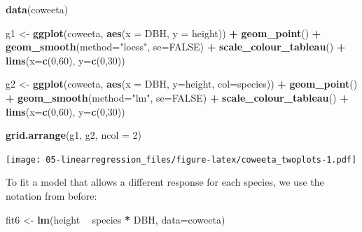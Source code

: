 \documentclass[]{book}
\newenvironment{Shaded}{\begin{snugshade}}{\end{snugshade}}
\newcommand{\DataTypeTok}[1]{\textcolor[rgb]{0.13,0.29,0.53}{#1}}
\newcommand{\DecValTok}[1]{\textcolor[rgb]{0.00,0.00,0.81}{#1}}
\newcommand{\KeywordTok}[1]{\textcolor[rgb]{0.13,0.29,0.53}{\textbf{#1}}}
\newcommand{\NormalTok}[1]{#1}
\newcommand{\OperatorTok}[1]{\textcolor[rgb]{0.81,0.36,0.00}{\textbf{#1}}}
\newcommand{\OtherTok}[1]{\textcolor[rgb]{0.56,0.35,0.01}{#1}}
\newcommand{\StringTok}[1]{\textcolor[rgb]{0.31,0.60,0.02}{#1}}
\begin{document}
\begin{Shaded}
\begin{Highlighting}[]
\KeywordTok{data}\NormalTok{(coweeta)}

\NormalTok{g1 <-}\StringTok{ }\KeywordTok{ggplot}\NormalTok{(coweeta, }\KeywordTok{aes}\NormalTok{(}\DataTypeTok{x =}\NormalTok{ DBH, }\DataTypeTok{y =}\NormalTok{ height)) }\OperatorTok{+}
\StringTok{  }\KeywordTok{geom_point}\NormalTok{() }\OperatorTok{+}\StringTok{ }\KeywordTok{geom_smooth}\NormalTok{(}\DataTypeTok{method=}\StringTok{"loess"}\NormalTok{, }\DataTypeTok{se=}\OtherTok{FALSE}\NormalTok{) }\OperatorTok{+}
\StringTok{  }\KeywordTok{scale_colour_tableau}\NormalTok{() }\OperatorTok{+}\StringTok{ }\KeywordTok{lims}\NormalTok{(}\DataTypeTok{x=}\KeywordTok{c}\NormalTok{(}\DecValTok{0}\NormalTok{,}\DecValTok{60}\NormalTok{), }\DataTypeTok{y=}\KeywordTok{c}\NormalTok{(}\DecValTok{0}\NormalTok{,}\DecValTok{30}\NormalTok{))}

\NormalTok{g2 <-}\StringTok{ }\KeywordTok{ggplot}\NormalTok{(coweeta, }\KeywordTok{aes}\NormalTok{(}\DataTypeTok{x =}\NormalTok{ DBH, }\DataTypeTok{y=}\NormalTok{height, }\DataTypeTok{col=}\NormalTok{species)) }\OperatorTok{+}
\StringTok{  }\KeywordTok{geom_point}\NormalTok{() }\OperatorTok{+}\StringTok{ }\KeywordTok{geom_smooth}\NormalTok{(}\DataTypeTok{method=}\StringTok{"lm"}\NormalTok{, }\DataTypeTok{se=}\OtherTok{FALSE}\NormalTok{) }\OperatorTok{+}
\StringTok{  }\KeywordTok{scale_colour_tableau}\NormalTok{() }\OperatorTok{+}\StringTok{ }\KeywordTok{lims}\NormalTok{(}\DataTypeTok{x=}\KeywordTok{c}\NormalTok{(}\DecValTok{0}\NormalTok{,}\DecValTok{60}\NormalTok{), }\DataTypeTok{y=}\KeywordTok{c}\NormalTok{(}\DecValTok{0}\NormalTok{,}\DecValTok{30}\NormalTok{))}

\KeywordTok{grid.arrange}\NormalTok{(g1, g2, }\DataTypeTok{ncol =} \DecValTok{2}\NormalTok{)}
\end{Highlighting}
\end{Shaded}

\texttt{[image: 05-linearregression\_files/figure-latex/coweeta\_twoplots-1.pdf]}

To fit a model that allows a different response for each species, we use the notation from before:

\begin{Shaded}
\begin{Highlighting}[]
\NormalTok{fit6 <-}\StringTok{ }\KeywordTok{lm}\NormalTok{(height }\OperatorTok{~}\StringTok{ }\NormalTok{species }\OperatorTok{*}\StringTok{ }\NormalTok{DBH, }\DataTypeTok{data=}\NormalTok{coweeta)}
\end{Highlighting}
\end{Shaded}
\end{document}

